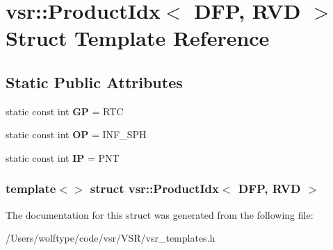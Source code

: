 \hypertarget{structvsr_1_1_product_idx_3_01_d_f_p_00_01_r_v_d_01_4}{\section{vsr\-:\-:Product\-Idx$<$ D\-F\-P, R\-V\-D $>$ Struct Template Reference}
\label{structvsr_1_1_product_idx_3_01_d_f_p_00_01_r_v_d_01_4}
}
\subsection*{Static Public Attributes}
\begin{DoxyCompactItemize}
\item 
\hypertarget{structvsr_1_1_product_idx_3_01_d_f_p_00_01_r_v_d_01_4_a40300e3080589ee91b514470b1e5c055}{static const int {\bfseries G\-P} = R\-T\-C}\label{structvsr_1_1_product_idx_3_01_d_f_p_00_01_r_v_d_01_4_a40300e3080589ee91b514470b1e5c055}

\item 
\hypertarget{structvsr_1_1_product_idx_3_01_d_f_p_00_01_r_v_d_01_4_abf90462cd817f6a5690a70712d8e34b5}{static const int {\bfseries O\-P} = I\-N\-F\-\_\-\-S\-P\-H}\label{structvsr_1_1_product_idx_3_01_d_f_p_00_01_r_v_d_01_4_abf90462cd817f6a5690a70712d8e34b5}

\item 
\hypertarget{structvsr_1_1_product_idx_3_01_d_f_p_00_01_r_v_d_01_4_a305a429ed0de7dfabfdba7dacc255271}{static const int {\bfseries I\-P} = P\-N\-T}\label{structvsr_1_1_product_idx_3_01_d_f_p_00_01_r_v_d_01_4_a305a429ed0de7dfabfdba7dacc255271}

\end{DoxyCompactItemize}
\subsubsection*{template$<$$>$ struct vsr\-::\-Product\-Idx$<$ D\-F\-P, R\-V\-D $>$}



The documentation for this struct was generated from the following file\-:\begin{DoxyCompactItemize}
\item 
/\-Users/wolftype/code/vsr/\-V\-S\-R/vsr\-\_\-templates.\-h\end{DoxyCompactItemize}
